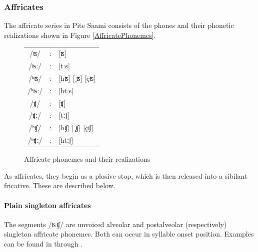 \FB

\subsubsection{Affricates}\label{Affricates}
The affricate series in Pite Saami consists of the phones and their phonetic realizations shown in Figure \vref{AffricatePhonemes}. \begin{figure}[h]\centering
\begin{tabular}{c c l}
/ʦ/ &:& [ʦ] \\ %
/ʦː/ &:& [tːs] \\ %
/ʰʦ/ &:& [hʦ] [ ̥ʦ] [çʦ] \\ %
/ʰʦː/ &:& [htːs] \\ %
/ʧ/ &:& [ʧ] \\ %
/ʧː/ &:& [tːʃ] \\ %
/ʰʧ/ &:& [hʧ] [ ̥ʧ] [çʧ]  \\ %
/ʰʧː/ &:& [htːʃ] \\ %
\end{tabular}
\caption{Affricate phonemes and their realizations}\label{AffricatePhonemes}
\end{figure}
As affricates, they begin as a plosive stop, which is then released into a sibilant fricative. %
These are described below.

\paragraph{Plain singleton affricates}\label{tstj}
The segments /ʦ\,ʧ/ are unvoiced alveolar and postalveolar (respectively) singleton affricate phonemes. Both can occur in syllable onset position. Examples can be found in  through .

